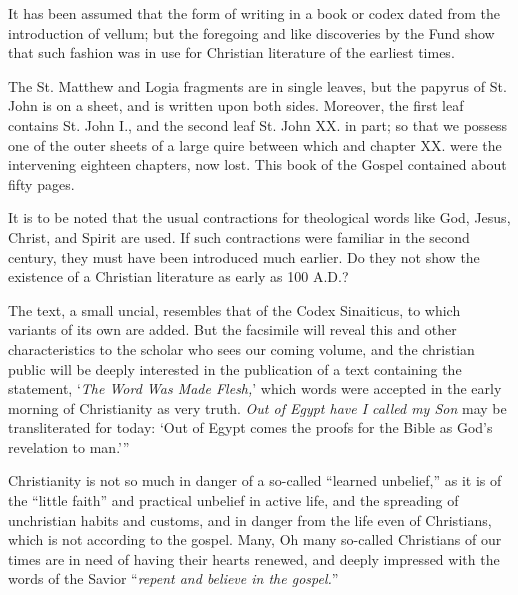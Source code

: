 It has been assumed that the form of writing in a book or codex dated from the introduction of vellum; but the foregoing and like discoveries by the Fund show that such fashion was in use for Christian literature of the earliest times.

The St. Matthew and Logia fragments are in single leaves, but the papyrus of St. John is on a sheet, and is written upon both sides. Moreover, the first leaf contains St. John I., and the second leaf St. John XX. in part; so that we possess one of the outer sheets of a large quire between which and chapter XX. were the intervening eighteen chapters, now lost. This book of the Gospel contained about fifty pages.

It is to be noted that the usual contractions for theological words like God, Jesus, Christ, and Spirit are used. If such contractions were familiar in the second century, they must have been introduced much earlier. Do they not show the existence of a Christian literature as early as 100 A.D.?

The text, a small uncial, resembles that of the Codex Sinaiticus, to which variants of its own are added. But the facsimile will reveal this and other characteristics to the scholar who sees our coming volume, and the christian public will be deeply interested in the publication of a text containing the statement, `\textit{The Word Was Made Flesh,}' which words were accepted in the early morning of Christianity as very truth. \textit{Out of Egypt have I called my Son} may be transliterated for today: `Out of Egypt comes the proofs for the Bible as God's revelation to man.'''

Christianity is not so much in danger of a so-called ``learned unbelief,'' as it is of the ``little faith'' and practical unbelief in active life, and the spreading of unchristian habits and customs, and in danger from the life even of Christians, which is not according to the gospel. Many, Oh many so-called Christians of our times are in need of having their hearts renewed, and deeply impressed with the words of the Savior ``\textit{repent and believe in the gospel.}''

